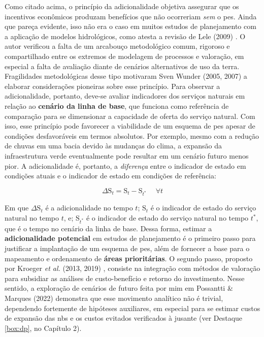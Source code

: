 \documentclass[./main.tex]{subfiles}
\begin{document}
Como citado acima, o princípio da adicionalidade objetiva assegurar que os incentivos econômicos produzam benefícios que não ocorreriam \textit{sem} o \acrshort{pes}. Ainda que pareça evidente, isso não era o caso em muitos estudos de planejamento com a aplicação de modelos hidrológicos, como atesta a revisão de Lele (2009) \cite{Lele2009a}. O autor verificou a falta de um arcabouço metodológico comum, rigoroso e compartilhado entre os extremos de modelagem de processos e valoração, em especial a falta de avaliação diante de cenários alternativos de uso da terra. Fragilidades metodológicas desse tipo motivaram Sven Wunder (2005, 2007) \cite{Wunder2005a, Wunder2007a} a elaborar considerações pioneiras sobre esse princípio. Para observar a adicionalidade, portanto, deve-se avaliar indicadores dos serviços naturais em relação ao \textbf{cenário da linha de base}, que funciona como referência de comparação para se dimensionar a capacidade de oferta do serviço natural. Com isso, esse princípio pode favorecer a viabilidade de um esquema de \acrshort{pes} apesar de condições desfavoráveis em termos absolutos. Por exemplo, mesmo com a redução de chuvas em uma bacia devido às mudanças do clima, a expansão da infraestrutura verde eventualmente pode resultar em um cenário futuro menos pior. A adicionalidade é, portanto, a \textit{diferença} entre o indicador de estado em condições atuais e o indicador de estado em condições de referência:
\begin{linenomath*}
\begin{equation}
\label{eq:aditionality}
\Delta\text{S}_{t} = \text{S}_{t} - \text{S}_{t^*} \quad \; \forall t 
\end{equation}
\end{linenomath*}
\noindent Em que $\Delta\text{S}_{t}$ é a adicionalidade no tempo $t$; $\text{S}_{t}$ é o indicador de estado do serviço natural no tempo $t$, e; $\text{S}_{t^*}$ é o indicador de estado do serviço natural no tempo $t^*$, que é o tempo no cenário da linha de base. Dessa forma, estimar a \textbf{adicionalidade potencial} em estudos de planejamento é o primeiro passo para justificar a implantação de um esquema de \acrshort{pes}, além de fornecer a base para o mapeamento e ordenamento de \textbf{áreas prioritárias}. O segundo passo, proposto por Kroeger \textit{et al.} (2013, 2019) \cite{Kroeger2013a, Kroeger2019a}, consiste na integração com métodos de valoração para subsidiar as análises de custo-benefício e retorno do investimento. Nesse sentido, a exploração de cenários de futuro feita por mim em Possantti \& Marques (2022) \cite{Possantti2022a} demonstra que esse movimento analítico não é trivial, dependendo fortemente de hipóteses auxiliares, em especial para se estimar custos de expansão das \acrshort{nbs} e os custos evitados verificados à jusante (ver Destaque \ref{box:dp}, no Capítulo 2).
\end{document}
